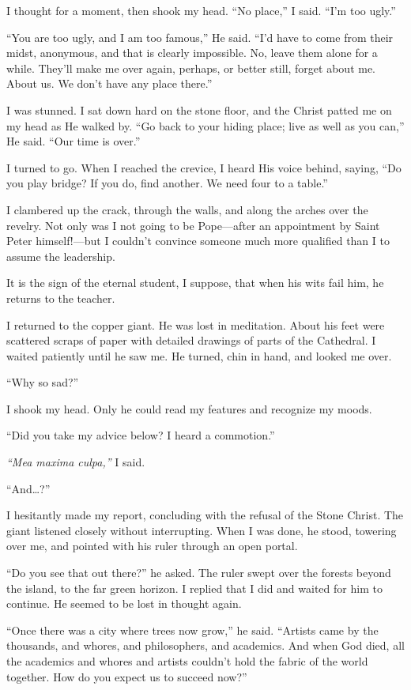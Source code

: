 I thought for a moment, then shook my head. ``No place,'' I said. ``I'm too ugly.''

``You are too ugly, and I am too famous,'' He said. ``I'd have to come from their midst, anonymous, and that is clearly impossible. No, leave them alone for a while. They'll make me over again, perhaps, or better still, forget about me. About us. We don't have any place there.''

I was stunned. I sat down hard on the stone floor, and the Christ patted me on my head as He walked by. ``Go back to your hiding place; live as well as you can,'' He said. ``Our time is over.''

I turned to go. When I reached the crevice, I heard His voice behind, saying, ``Do you play bridge? If you do, find another. We need four to a table.''

I clambered up the crack, through the walls, and along the arches over the revelry. Not only was I not going to be Pope—after an appointment by Saint Peter himself!—but I couldn't convince someone much more qualified than I to assume the leadership.

It is the sign of the eternal student, I suppose, that when his wits fail him, he returns to the teacher.

I returned to the copper giant. He was lost in meditation. About his feet were scattered scraps of paper with detailed drawings of parts of the Cathedral. I waited patiently until he saw me. He turned, chin in hand, and looked me over.

``Why so sad?''

I shook my head. Only he could read my features and recognize my moods.

``Did you take my advice below? I heard a commotion.''

\textit{``Mea maxima culpa,''} I said.

``And\ldots ?''

I hesitantly made my report, concluding with the refusal of the Stone Christ. The giant listened closely without interrupting. When I was done, he stood, towering over me, and pointed with his ruler through an open portal.

``Do you see that out there?'' he asked. The ruler swept over the forests beyond the island, to the far green horizon. I replied that I did and waited for him to continue. He seemed to be lost in thought again.

``Once there was a city where trees now grow,'' he said. ``Artists came by the thousands, and whores, and philosophers, and academics. And when God died, all the academics and whores and artists couldn't hold the fabric of the world together. How do you expect us to succeed now?''

